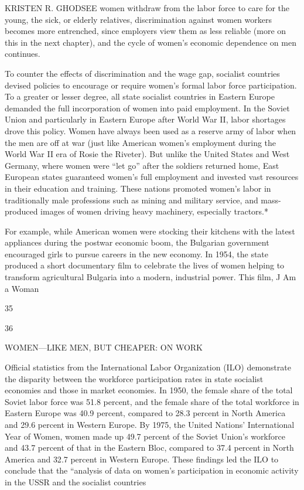  \par 
KRISTEN R. GHODSEE women withdraw from the labor force to care for the young, the sick, or elderly relatives, discrimination against women workers becomes more entrenched, since employers view them as less reliable (more on this in the next chapter), and the cycle of women’s economic dependence on men continues.
 \par 
To counter the effects of discrimination and the wage gap, socialist countries devised policies to encourage or require women’s formal labor force participation. To a greater or lesser degree, all state socialist countries in Eastern Europe demanded the full incorporation of women into paid employment. In the Soviet Union and particularly in Eastern Europe after World War II, labor shortages drove this policy. Women have always been used as a reserve army of labor when the men are off at war (just like American women’s employment during the World War II era of Rosie the Riveter). But unlike the United States and West Germany, where women were “let go” after the soldiers returned home, East European states guaranteed women’s full employment and invested vast resources in their education and training. These nations promoted women’s labor in traditionally male professions such as mining and military service, and mass-produced images of women driving heavy machinery, especially tractors.*
 \par 
For example, while American women were stocking their kitchens with the latest appliances during the postwar economic boom, the Bulgarian government encouraged girls to pursue careers in the new economy. In 1954, the state produced a short documentary film to celebrate the lives of women helping to transform agricultural Bulgaria into a modern, industrial power. This film, J Am a Woman
 \par 
35
 \par 
36
 \par 
WOMEN—LIKE MEN, BUT CHEAPER: ON WORK
 \par 
Official statistics from the International Labor Organization (ILO) demonstrate the disparity between the workforce participation rates in state socialist economies and those in market economies. In 1950, the female share of the total Soviet labor force was {\color{blue}51}.{\color{blue}8} percent, and the female share of the total workforce in Eastern Europe was {\color{blue}40}.{\color{blue}9} percent, compared to {\color{blue}28}.{\color{blue}3} percent in North America and {\color{blue}29}.{\color{blue}6} percent in Western Europe. By 1975, the United Nations’ International Year of Women, women made up {\color{blue}49}.{\color{blue}7} percent of the Soviet Union’s workforce and {\color{blue}43}.{\color{blue}7} percent of that in the Eastern Bloc, compared to {\color{blue}37}.{\color{blue}4} percent in North America and {\color{blue}32}.{\color{blue}7} percent in Western Europe. These findings led the ILO to conclude that the “analysis of data on women’s participation in economic activity in the USSR and the socialist countries
